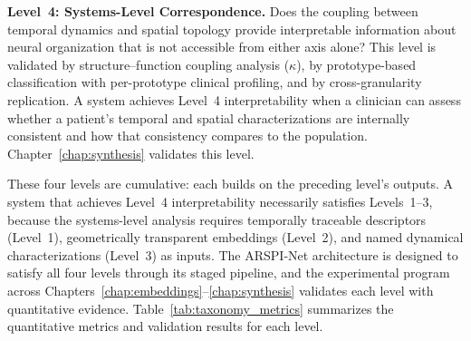 \textbf{Level~4: Systems-Level Correspondence.} Does the coupling between temporal dynamics and spatial topology provide interpretable information about neural organization that is not accessible from either axis alone? This level is validated by structure--function coupling analysis ($\kappa$), by prototype-based classification with per-prototype clinical profiling, and by cross-granularity replication. A system achieves Level~4 interpretability when a clinician can assess whether a patient's temporal and spatial characterizations are internally consistent and how that consistency compares to the population. Chapter~\ref{chap:synthesis} validates this level.

These four levels are cumulative: each builds on the preceding level's outputs. A system that achieves Level~4 interpretability necessarily satisfies Levels~1--3, because the systems-level analysis requires temporally traceable descriptors (Level~1), geometrically transparent embeddings (Level~2), and named dynamical characterizations (Level~3) as inputs. The ARSPI-Net architecture is designed to satisfy all four levels through its staged pipeline, and the experimental program across Chapters~\ref{chap:embeddings}--\ref{chap:synthesis} validates each level with quantitative evidence. Table~\ref{tab:taxonomy_metrics} summarizes the quantitative metrics and validation results for each level.

